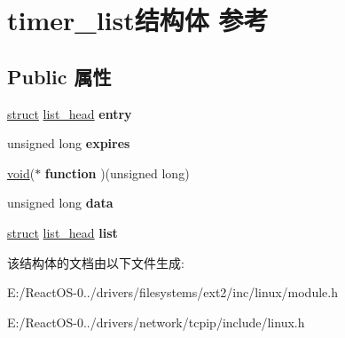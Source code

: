 \hypertarget{structtimer__list}{}\section{timer\+\_\+list结构体 参考}
\label{structtimer__list}
\subsection*{Public 属性}
\begin{DoxyCompactItemize}
\item 
\mbox{\label{structtimer__list_ad089bb5933f16672df827d393131a681}} 
\hyperlink{interfacestruct}{struct} \hyperlink{structlist__head}{list\+\_\+head} {\bfseries entry}
\item 
\mbox{\label{structtimer__list_afdb204dba2d2b902544255dea285c8bd}} 
unsigned long {\bfseries expires}
\item 
\mbox{\label{structtimer__list_a830fbf2dbd9b9df2af2d6890e315c1a4}} 
\hyperlink{interfacevoid}{void}($\ast$ {\bfseries function} )(unsigned long)
\item 
\mbox{\label{structtimer__list_af135d46b30969e13bfa66d6760c795f2}} 
unsigned long {\bfseries data}
\item 
\mbox{\label{structtimer__list_a845c6f8592b64b2e2d2ee53d43552e20}} 
\hyperlink{interfacestruct}{struct} \hyperlink{structlist__head}{list\+\_\+head} {\bfseries list}
\end{DoxyCompactItemize}


该结构体的文档由以下文件生成\+:\begin{DoxyCompactItemize}
\item 
E\+:/\+React\+O\+S-\/0../drivers/filesystems/ext2/inc/linux/module.\+h\item 
E\+:/\+React\+O\+S-\/0../drivers/network/tcpip/include/linux.\+h\end{DoxyCompactItemize}
